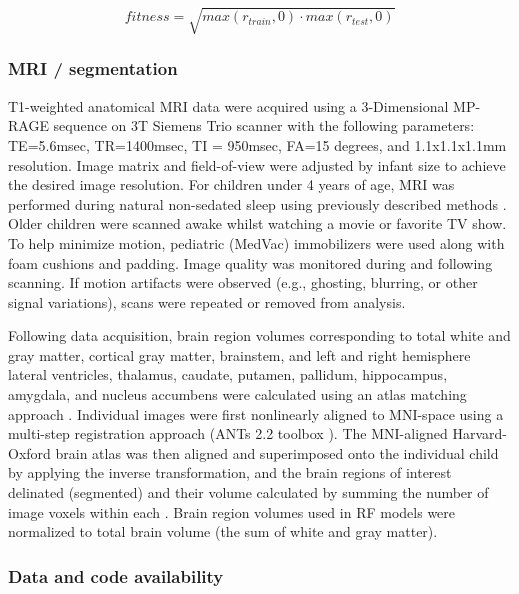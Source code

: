 \documentclass{article}
\begin{document}
\begin{equation}
    fitness = \sqrt{max(r_{train}, 0) \cdot max(r_{test}, 0)}
\end{equation}


\subsubsection*{MRI / segmentation}

T1-weighted anatomical MRI data were acquired using a 3-Dimensional MP-RAGE sequence
on 3T Siemens Trio scanner with the following parameters:
TE=5.6msec, TR=1400msec, TI = 950msec, FA=15 degrees, and 1.1x1.1x1.1mm resolution.
Image matrix and field-of-view were adjusted by infant size to achieve the desired image resolution.
For children under 4 years of age, MRI was performed during natural non-sedated sleep using previously described methods \cite{deanPediatricNeuroimagingUsing2014}.
Older children were scanned awake whilst watching a movie or favorite TV show.
To help minimize motion, pediatric (MedVac) immobilizers were used along with foam cushions and padding.
Image quality was monitored during and following scanning.
If motion artifacts were observed (e.g., ghosting, blurring, or other signal variations),
scans were repeated or removed from analysis.

Following data acquisition, brain region volumes corresponding to total white and gray matter,
cortical gray matter, brainstem, and left and right hemisphere lateral ventricles,
thalamus, caudate, putamen, pallidum, hippocampus, amygdala,
and nucleus accumbens were calculated using an atlas matching approach \cite{bruchhageLongitudinalBrainCognitive}.
Individual images were first nonlinearly aligned to MNI-space using
a multi-step registration approach (ANTs 2.2 toolbox \cite{avantsInsightToolKitImage2014}).
The MNI-aligned Harvard-Oxford brain atlas was then aligned and superimposed onto the individual child
by applying the inverse transformation, and the brain regions of interest delinated (segmented)
and their volume calculated by summing the number of image voxels within each \cite{jenkinsonFSL2012}.
Brain region volumes used in RF models were normalized to total brain volume
(the sum of white and gray matter).

\subsubsection*{Data and code availability}
\end{document}
